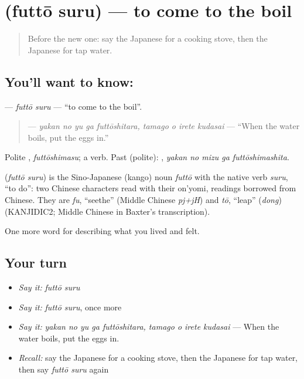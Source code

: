 \section[\texorpdfstring{\ja{ふっとうする} (futtō suru)}{ふっとうする (futtō suru)}]{ (futtō suru) — to come to the boil}

\label{lesson:JA-C491-futtou-suru}



\begin{quote}
Before the new one: say the Japanese for a cooking stove, then the Japanese for tap water.
\end{quote}

\subsection*{You'll want to know: }
\textbf{} — \emph{futtō suru} — \textquotedblleft{}to come to the boil\textquotedblright{}.

\begin{quote}
\textbf{    } — \emph{yakan no yu ga futtōshitara, tamago o irete kudasai} — \textquotedblleft{}When the water boils, put the eggs in.\textquotedblright{}
\end{quote}

Polite \textbf{}, \emph{futtōshimasu}; a  verb. Past (polite): \textbf{  }, \emph{yakan no mizu ga futtōshimashita}.

\begin{cousinweb}
\textbf{} (\emph{futtō suru}) is the Sino-Japanese (kango) noun \emph{futtō} with the native verb \emph{suru}, \textquotedblleft{}to do\textquotedblright{}: two Chinese characters read with their on'yomi, readings borrowed from Chinese. They are \emph{fu}, \textquotedblleft{}seethe\textquotedblright{} (Middle Chinese \emph{pj+jH}) and \emph{tō}, \textquotedblleft{}leap\textquotedblright{} (\emph{dong}) (KANJIDIC2; Middle Chinese in Baxter's transcription).
\end{cousinweb}

\begin{grammarlens}[title={What you've built}]
One more word for describing what you lived and felt.
\end{grammarlens}

\subsection*{Your turn}
\begin{itemize}
\raggedright
  \item \emph{Say it:} \emph{futtō suru}
  \item \emph{Say it:} \emph{futtō suru}, once more
  \item \emph{Say it:} \emph{yakan no yu ga futtōshitara, tamago o irete kudasai} — When the water boils, put the eggs in.
  \item \emph{Recall:} say the Japanese for a cooking stove, then the Japanese for tap water, then say \emph{futtō suru} again
\end{itemize}

